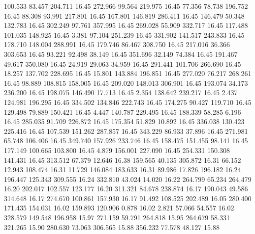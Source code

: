  100.533   83.457  204.711        16.45
 272.966   99.564  219.975        16.45
  77.356   78.738  196.752        16.45
  88.308   93.991  217.801        16.45
 167.801  146.819  286.411        16.45
 146.479   50.348  132.783        16.45
 302.249   97.761  357.995        16.45
 269.028   55.909  332.717        16.45
 117.488  101.035  148.925        16.45
   3.381   97.104  251.239        16.45
 331.902  141.517  243.833        16.45
 178.710  148.004  288.991        16.45
 179.746   86.467  308.750        16.45
 217.016   36.366  303.653        16.45
  93.221   92.498   38.149        16.45
 351.696   32.149   74.384        16.45
 191.467   49.617  350.080        16.45
  24.919   29.063   34.959        16.45
 291.441  101.706  266.690        16.45
  18.257  137.702  228.695        16.45
  15.801  143.884  196.851        16.45
 277.020   76.217  268.261        16.45
  98.889  108.815  158.005        16.45
 209.020  148.013  306.901        16.45
 193.074   34.173  236.200        16.45
 198.075  146.490   17.713        16.45
   2.354  138.642  239.217        16.45
   2.437  124.981  196.295        16.45
 334.502  134.846  222.743        16.45
 174.275   90.427  119.710        16.45
 129.498   79.889  150.421        16.45
   4.447  140.787  229.495        16.45
 188.339   58.285    6.196        16.45
 285.035   91.709  226.872        16.45
 175.354   51.829   10.892        16.45
 336.038  130.423  225.416        16.45
 107.539  151.262  287.857        16.45
 343.229   86.933   37.896        16.45
 271.981   65.748  106.406        16.45
 349.740  157.926  233.746        16.45
 158.475  151.455   98.141        16.45
 177.149  100.665  103.800        16.45
   4.879  156.001  227.090        16.45
 254.331  150.308  141.431        16.45
 313.512   67.379   12.646        16.38
 159.565   40.135  305.872        16.31
  66.152   12.943  108.474        16.31
  11.729  146.084  183.633        16.31
  89.986   17.826  196.182        16.24
 196.447  125.343  309.555        16.24
 332.810   43.024   14.020        16.22
 264.799   65.234  264.479        16.20
 202.017  102.557  123.177        16.20
 311.321   84.678  238.874        16.17
 190.043   49.586  314.648        16.17
 274.670  100.861  157.930        16.17
  91.492  108.525  202.489        16.05
 280.400  171.435  154.031        16.02
 159.893  120.906    0.878        16.02
   2.821   57.066   54.557        16.02
 328.579  149.548  196.958        15.97
 271.159   59.791  264.818        15.95
 264.679   58.331  321.265        15.90
 280.630   73.063  306.565        15.88
 356.232   77.578   48.127        15.88
